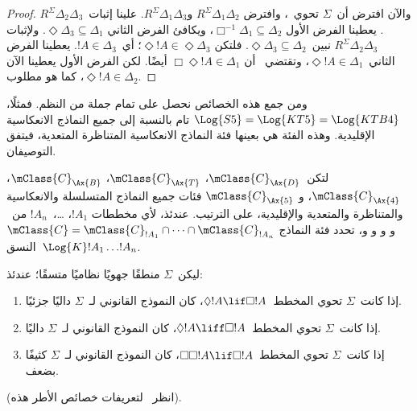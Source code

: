 \documentclass[../../../include/open-logic-section]{subfiles}
\begin{document}
\begin{proof}
  والآن افترض أن~$\Sigma$ تحوي~، وافترض
  $R^\Sigma \Delta_1\Delta_2$ و$R^\Sigma \Delta_1\Delta_3$.
  علينا إثبات~$R^\Sigma \Delta_2\Delta_3$. يعطينا الفرض الأول
  $\Box^{-1}\Delta_1 \subseteq \Delta_2$، ويكافئ الفرض الثاني
  $\Diamond\Delta_3 \subseteq \Delta_1$. ولإثبات
  $R^\Sigma \Delta_2\Delta_3$
  نبين~$\Diamond\Delta_3 \subseteq \Delta_2$. فلتكن
  $\Diamond!A \in \Diamond\Delta_3$؛ أي~$!A \in \Delta_3$. يعطينا
  الفرض الثاني~$\Diamond!A \in \Delta_1$، وتقتضي~ أن
  $\Box\Diamond!A \in \Delta_1$ أيضًا. لكن الفرض الأول يعطينا الآن
  $\Diamond!A \in \Delta_2$، كما هو مطلوب.
\end{proof}

ومن جمع هذه الخصائص نحصل على تمام جملة من النظم.
فمثلًا، $ \Log{S5} = \Log{KT5} = \Log{KTB4}$
تام بالنسبة إلى جميع النماذج الانعكاسية الإقليدية.
وهذه الفئة هي بعينها فئة النماذج الانعكاسية المتناظرة المتعدية،
فيتفق التوصيفان.

\begin{thm}
  لتكن~$\mClass{C}_\Ax{D}$، $\mClass{C}_\Ax{T}$،
  $\mClass{C}_\Ax{B}$، $\mClass{C}_\Ax{4}$، و
  $\mClass{C}_\Ax{5}$ فئات جميع النماذج المتسلسلة والانعكاسية
  والمتناظرة والمتعدية والإقليدية، على الترتيب. عندئذ، لأي مخططات
  $!A_1$، \dots،~$!A_n$ من~ و و و و،
  تحدد فئة النماذج
  $\mClass{C} = \mClass{C}_{!A_1} \cap \dots
  \cap \mClass{C}_{!A_n}$ النسق~$\Log{K}!A_1 \dots !A_n$.
\end{thm}

\begin{prop}
  ليكن~$\Sigma$ منطقًا جهويًا نظاميًا متسقًا؛ عندئذ:
  \begin{enumerate}
  \item{}%
    إذا كانت~$\Sigma$ تحوي المخطط~$\Diamond!A \lif \Box !A$، كان
    النموذج القانوني لـ~$\Sigma$ داليًا جزئيًا.
  \item إذا كانت~$\Sigma$ تحوي المخطط~$\Diamond!A \liff \Box !A$،
    كان النموذج القانوني لـ~$\Sigma$ داليًا.
  \item إذا كانت~$\Sigma$ تحوي المخطط~$\Box\Box!A \lif \Box !A$،
    كان النموذج القانوني لـ~$\Sigma$ كثيفًا بضعف.
  \end{enumerate}
(انظر~ لتعريفات خصائص الأطر هذه).
\end{prop}
\end{document}
